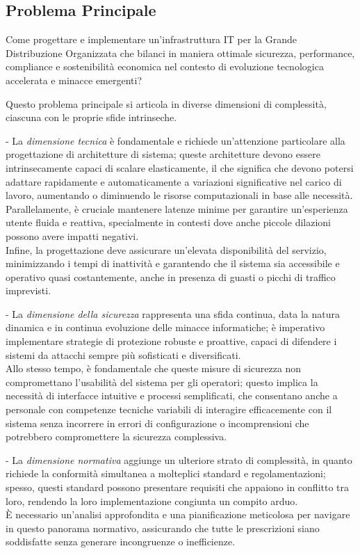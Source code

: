 \documentclass[12pt,a4paper,oneside]{book}
\begin{document}
\subsection{\texorpdfstring{\textbf{Problema
Principale}}{1.2.1 Problema Principale}}\label{problema-principale}

Come progettare e implementare un'infrastruttura IT per la Grande
Distribuzione Organizzata che bilanci in maniera ottimale sicurezza,
performance, compliance e sostenibilità economica nel contesto di
evoluzione tecnologica accelerata e minacce emergenti?

Questo problema principale si articola in diverse dimensioni di
complessità, ciascuna con le proprie sfide intrinseche.

- La \emph{dimensione tecnica} è fondamentale e richiede un'attenzione
particolare alla progettazione di architetture di sistema; queste
architetture devono essere intrinsecamente capaci di scalare
elasticamente, il che significa che devono potersi adattare rapidamente
e automaticamente a variazioni significative nel carico di lavoro,
aumentando o diminuendo le risorse computazionali in base alle
necessità.\\
Parallelamente, è cruciale mantenere latenze minime per garantire
un'esperienza utente fluida e reattiva, specialmente in contesti dove
anche piccole dilazioni possono avere impatti negativi.\\
Infine, la progettazione deve assicurare un'elevata disponibilità del
servizio, minimizzando i tempi di inattività e garantendo che il sistema
sia accessibile e operativo quasi costantemente, anche in presenza di
guasti o picchi di traffico imprevisti.

- La \emph{dimensione della sicurezza} rappresenta una sfida continua,
data la natura dinamica e in continua evoluzione delle minacce
informatiche; è imperativo implementare strategie di protezione robuste
e proattive, capaci di difendere i sistemi da attacchi sempre più
sofisticati e diversificati.\\
Allo stesso tempo, è fondamentale che queste misure di sicurezza non
compromettano l'usabilità del sistema per gli operatori; questo implica
la necessità di interfacce intuitive e processi semplificati, che
consentano anche a personale con competenze tecniche variabili di
interagire efficacemente con il sistema senza incorrere in errori di
configurazione o incomprensioni che potrebbero compromettere la
sicurezza complessiva.

- La \emph{dimensione normativa} aggiunge un ulteriore strato di
complessità, in quanto richiede la conformità simultanea a molteplici
standard e regolamentazioni; spesso, questi standard possono presentare
requisiti che appaiono in conflitto tra loro, rendendo la loro
implementazione congiunta un compito arduo.\\
È necessario un'analisi approfondita e una pianificazione meticolosa per
navigare in questo panorama normativo, assicurando che tutte le
prescrizioni siano soddisfatte senza generare incongruenze o
inefficienze.
\end{document}
